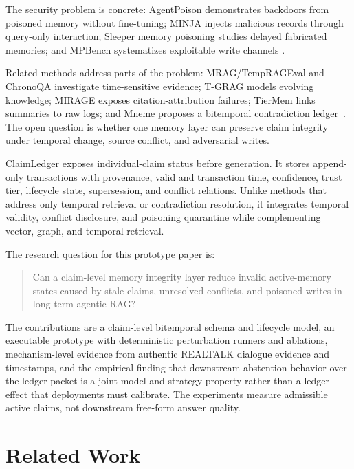 The security problem is concrete: AgentPoison demonstrates backdoors from poisoned memory without fine-tuning; MINJA injects malicious records through query-only interaction; Sleeper memory poisoning studies delayed fabricated memories; and MPBench systematizes exploitable write channels \cite{chen2024agentpoison,dong2025minja,pulipaka2026sleeper,dash2026mpbench}.

Related methods address parts of the problem: MRAG\slash TempRAGEval and ChronoQA investigate time-sensitive evidence; T-GRAG models evolving knowledge; MIRAGE exposes citation-attribution failures; TierMem links summaries to raw logs; and Mneme proposes a bitemporal contradiction ledger~\cite{zhang2024mrag,chen2025chronoqa,li2025tgrag,qi2024mirage,zhu2026tiermem,mneme2026}. The open question is whether one memory layer can preserve claim integrity under temporal change, source conflict, and adversarial writes.

ClaimLedger exposes individual-claim status before generation. It stores append-only transactions with provenance, valid and transaction time, confidence, trust tier, lifecycle state, supersession, and conflict relations. Unlike methods that address only temporal retrieval or contradiction resolution, it integrates temporal validity, conflict disclosure, and poisoning quarantine while complementing vector, graph, and temporal retrieval.

The research question for this prototype paper is:

\begin{quote}
Can a claim-level memory integrity layer reduce invalid active-memory states caused by stale claims, unresolved conflicts, and poisoned writes in long-term agentic RAG?
\end{quote}

The contributions are a claim-level bitemporal schema and lifecycle model, an executable prototype with deterministic perturbation runners and ablations, mechanism-level evidence from authentic REALTALK dialogue evidence and timestamps, and the empirical finding that downstream abstention behavior over the ledger packet is a joint model-and-strategy property rather than a ledger effect that deployments must calibrate. The experiments measure admissible active claims, not downstream free-form answer quality.

\section{Related Work}\label{sec:related-work}

